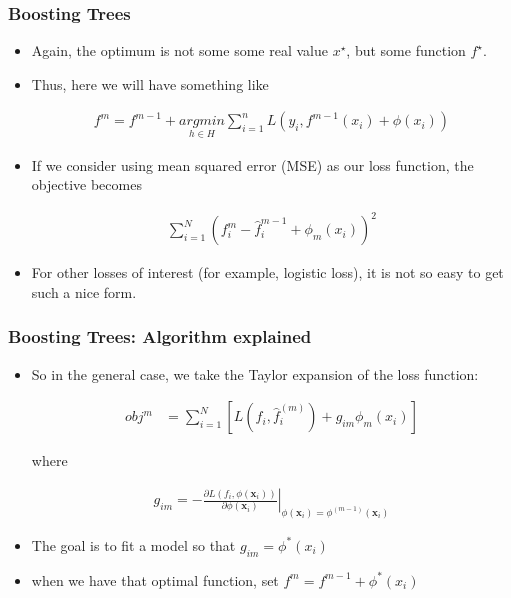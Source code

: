 \documentclass[
  shownotes,
  xcolor={svgnames},
  hyperref={colorlinks,citecolor=DarkBlue,linkcolor=DarkRed,urlcolor=DarkBlue}
  , aspectratio=169]{beamer}
\begin{document}
\begin{frame}[fragile]
\frametitle{Boosting Trees}

\begin{itemize}


\item Again, the optimum is not some some real value $x^\star$, but some function $f^\star$. 
\item Thus, here we will have something like

\begin{align}
f^{m}=f^{m-1}+\underset{h\in H}{argmin}\sum_{i=1}^nL(y_i,f^{m-1}(x_i)+ \phi(x_i))
\end{align}

\item If we consider using mean squared error (MSE) as our loss function, the objective becomes

\begin{align}
\sum_{i=1}^N (f^m_i-\hat{f}_i^{m-1} + \phi_m(x_i))^2
\end{align}

\item  For other losses of interest (for example, logistic loss), it is not so easy to get such a nice form.
\end{itemize}
 \end{frame}
\begin{frame}[fragile]
\frametitle{Boosting Trees: Algorithm explained}

\begin{itemize}
\item  So in the general case, we take the Taylor expansion of the loss function:

\begin{align}
obj^m &= \sum_{i=1}^N \left[ L(f_i,\hat{f}_i^{(m)}) + g_{im} \phi_m(x_i) \right]
\end{align}

where 

\begin{align}
        g_{im}=-\left.\frac{\partial L(f_i,\phi(\mathbf{x}_i))}{\partial \phi(\mathbf{x}_i)}\right\vert_{\phi(\mathbf{x}_i)=\phi^{(m-1)}(\mathbf{x}_i)}
  \end{align}

\item The goal is to fit a model so that $g_{im}=\phi^*(x_i)$
\item when we have that optimal function, set $f^{m}=f^{m-1}+\phi^*(x_i)$
\end{itemize}
 \end{frame}
\end{document}
